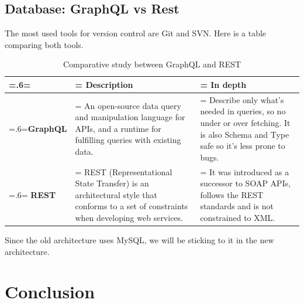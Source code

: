 \subsection{Database: GraphQL vs Rest}
The most used tools for version control are Git and SVN. Here is a table comparing both tools.
\begin{table}[H]
    \renewcommand{\arraystretch}{1.5}%
    \caption{Comparative study between GraphQL and REST \cite{graphql-vs-rest}}
    \centering
    \medskip
    \begin{tabularx}{1\textwidth} {
            | >{\hsize=.6\hsize\linewidth=\hsize\centering\arraybackslash}X
            | >{\hsize=1.2\hsize\linewidth=\hsize\centering\arraybackslash}X
            | >{\hsize=1.2\hsize\linewidth=\hsize\centering\arraybackslash}X |}
        \hline
        \rowcolor{primary} & \textbf {Description}                                                                                                                & \textbf {In depth}                                                                                                                \\
        \hline
        \textbf{GraphQL}   & An open-source data query and manipulation language for APIs, and a runtime for fulfilling queries with existing data.               & Describe only what's needed in queries, so no under or over fetching. It is also Schema and Type safe so it's less prone to bugs. \\
        \hline
        \textbf{REST}      & REST (Representational State Transfer) is an architectural style that conforms to a set of constraints when developing web services. & It was introduced as a successor to SOAP APIs, follows the REST standards and is not constrained to XML.                          \\
        \hline
    \end{tabularx}
\end{table}
Since the old architecture uses MySQL, we will be sticking to it in the new architecture.

\setcounter{secnumdepth}{0} %
\section{Conclusion}
\lipsum[2]
